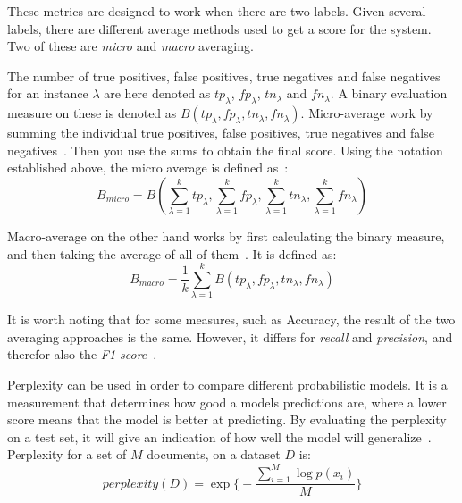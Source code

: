 These metrics are designed to work when there are two labels.
Given several labels, there are different average methods used to get a score for the system.
Two of these are \textit{micro} and \textit{macro} averaging.

The number of true positives, false positives, true negatives and false negatives for an instance $\lambda$ are here denoted as $tp_\lambda$, $fp_\lambda$, $tn_\lambda$ and $fn_\lambda$.
A binary evaluation measure on these is denoted as $B(tp_\lambda, fp_\lambda, tn_\lambda, fn_\lambda)$.
Micro-average work by summing the individual true positives, false positives, true negatives and false negatives~\cite{tsoumakas2009mining}.
Then you use the sums to obtain the final score.
Using the notation established above, the micro average is defined as~\cite{tsoumakas2009mining}:
\begin{equation}
    B_{micro} = B(\sum_{\lambda = 1}^ktp_\lambda, \sum_{\lambda = 1}^kfp_\lambda, \sum_{\lambda = 1}^ktn_\lambda, \sum_{\lambda = 1}^kfn_\lambda)
\end{equation}

Macro-average on the other hand works by first calculating the binary measure, and then taking the average of all of them~\cite{tsoumakas2009mining}.
It is defined as:
\begin{equation}
    B_{macro} = \frac{1}{k}\sum_{\lambda = 1}^kB(tp_\lambda, fp_\lambda, tn_\lambda, fn_\lambda)
\end{equation}

It is worth noting that for some measures, such as Accuracy, the result of the two averaging approaches is the same.
However, it differs for \textit{recall} and \textit{precision}, and therefor also the \textit{F1-score}~\cite{tsoumakas2009mining}.

Perplexity can be used in order to compare different probabilistic models. 
It is a measurement that determines how good a models predictions are, where a lower score means that the model is better at predicting.
By evaluating the perplexity on a test set, it will give an indication of how well the model will generalize~\cite{blei2003latent}.
Perplexity for a set of $M$ documents, on a dataset $D$ is:
\begin{equation}
    perplexity(D) = \exp \big \{ -\frac{\sum_{i=1}^M \log p(x_i) }{M} \big \}
\end{equation}
